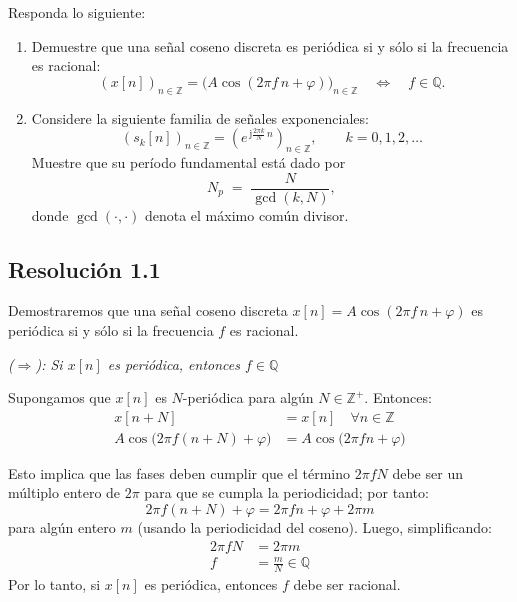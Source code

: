 \documentclass[
  11pt,
  letterpaper,
   addpoints,
  ]{exam}
\begin{document}
\begin{questions}
\question Responda lo siguiente:
\begin{enumerate}

  \item Demuestre que una señal coseno discreta es periódica si y sólo si la frecuencia es racional:
  \begin{equation}
    (x[n])_{n\in\mathbb{Z}}
    =\bigl(A\cos(2\pi f\,n+\varphi)\bigr)_{n\in\mathbb{Z}}
    \quad\Longleftrightarrow\quad f\in\mathbb{Q}.
  \end{equation}

  \item Considere la siguiente familia de señales exponenciales:
  \begin{equation}
    (s_k[n])_{n\in\mathbb{Z}}
    =\left(e^{\,\mathrm{j}\frac{2\pi k}{N}\,n}\right)_{n\in\mathbb{Z}},
    \qquad k=0,1,2,\ldots
  \end{equation}
  Muestre que su período fundamental está dado por
  \begin{equation}
    N_p \;=\; \frac{N}{\gcd(k,N)},
  \end{equation}
  donde \(\gcd(\cdot,\cdot)\) denota el máximo común divisor.
\end{enumerate}
  \begin{solution}

\subsection*{Resolución 1.1}

Demostraremos que una señal coseno discreta \(x[n] = A\cos(2\pi f\,n+\varphi)\) es periódica si y sólo si la frecuencia \(f\) es racional.

\emph{(\(\Rightarrow\)): Si \(x[n]\) es periódica, entonces \(f \in \mathbb{Q}\)}

Supongamos que \(x[n]\) es \(N\)-periódica para algún \(N \in \mathbb{Z}^+\). Entonces:
\begin{align}
x[n+N] &= x[n] \quad \forall n \in \mathbb{Z} \\
A\cos\!\big(2\pi f(n+N)+\varphi\big) &= A\cos\!\big(2\pi fn+\varphi\big)
\end{align}

Esto implica que las fases deben cumplir que el término \(2\pi fN\) debe ser un múltiplo entero de \(2\pi\) para que se cumpla la periodicidad; por tanto:
\begin{equation}
2\pi f(n+N) + \varphi = 2\pi fn + \varphi + 2\pi m
\end{equation}
para algún entero \(m\) (usando la periodicidad del coseno). Luego, simplificando:
\begin{align}
2\pi fN &= 2\pi m \\
f &= \frac{m}{N} \in \mathbb{Q}
\end{align}
Por lo tanto, si \(x[n]\) es periódica, entonces \(f\) debe ser racional.


\end{solution}
\end{questions}
\end{document}
